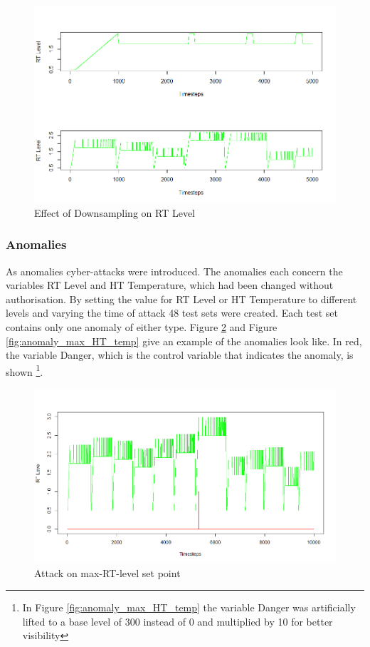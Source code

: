 \begin{figure}[h]
	\centering
	\includegraphics[scale=0.6]{Figures/downsample}
	\decoRule
	\caption[Effect of Downsampling]{Effect of Downsampling on RT Level \parencite{Own}}
	\label{fig:downsample}
\end{figure}

\newpage
\subsubsection{Anomalies} \label{GHL_Anomalies}
As anomalies cyber-attacks were introduced. The anomalies each concern the variables RT Level and HT Temperature, which had been changed without authorisation. By setting the value for RT Level or HT Temperature to different levels and varying the time of attack 48 test sets were created. Each test set contains only one anomaly of either type. Figure \ref{fig:anomaly_max_RT_level} and Figure \ref{fig:anomaly_max_HT_temp} give an example of the anomalies look like. In red, the variable Danger, which is the control variable that indicates the anomaly, is shown \footnote{In Figure \ref{fig:anomaly_max_HT_temp} the variable Danger was artificially lifted to a base level of 300 instead of 0 and multiplied by 10 for better visibility}.

\begin{figure}[h]
	\centering
	\includegraphics[scale=0.4]{Figures/anomaly_max_RT_level}
	\decoRule
	\caption[Attack on max-RT-level set point]{Attack on max-RT-level set point \parencite{Own}}
	\label{fig:anomaly_max_RT_level}
\end{figure}


